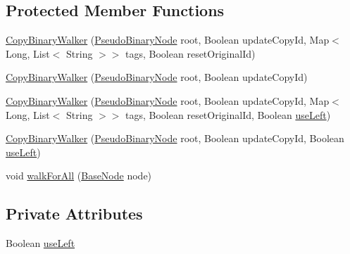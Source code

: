 \subsection*{Protected Member Functions}
\begin{DoxyCompactItemize}
\item 
\hyperlink{classit_1_1emarolab_1_1cagg_1_1core_1_1PseudoBinaryNode_1_1CopyBinaryWalker_a72a1ea8e24e0329cebfaa15f3ab577b2}{Copy\-Binary\-Walker} (\hyperlink{classit_1_1emarolab_1_1cagg_1_1core_1_1PseudoBinaryNode}{Pseudo\-Binary\-Node} root, Boolean update\-Copy\-Id, Map$<$ Long, List$<$ String $>$$>$ tags, Boolean reset\-Original\-Id)
\item 
\hyperlink{classit_1_1emarolab_1_1cagg_1_1core_1_1PseudoBinaryNode_1_1CopyBinaryWalker_a852a56b0a0f2d91c076d951e014b59b8}{Copy\-Binary\-Walker} (\hyperlink{classit_1_1emarolab_1_1cagg_1_1core_1_1PseudoBinaryNode}{Pseudo\-Binary\-Node} root, Boolean update\-Copy\-Id)
\item 
\hyperlink{classit_1_1emarolab_1_1cagg_1_1core_1_1PseudoBinaryNode_1_1CopyBinaryWalker_a817a936ca5015b543f218ca2652068a7}{Copy\-Binary\-Walker} (\hyperlink{classit_1_1emarolab_1_1cagg_1_1core_1_1PseudoBinaryNode}{Pseudo\-Binary\-Node} root, Boolean update\-Copy\-Id, Map$<$ Long, List$<$ String $>$$>$ tags, Boolean reset\-Original\-Id, Boolean \hyperlink{classit_1_1emarolab_1_1cagg_1_1core_1_1PseudoBinaryNode_1_1CopyBinaryWalker_a9d3d065b72a5c54d4cc8aaba58bb1115}{use\-Left})
\item 
\hyperlink{classit_1_1emarolab_1_1cagg_1_1core_1_1PseudoBinaryNode_1_1CopyBinaryWalker_abd581c43368c70c79904346058b14e71}{Copy\-Binary\-Walker} (\hyperlink{classit_1_1emarolab_1_1cagg_1_1core_1_1PseudoBinaryNode}{Pseudo\-Binary\-Node} root, Boolean update\-Copy\-Id, Boolean \hyperlink{classit_1_1emarolab_1_1cagg_1_1core_1_1PseudoBinaryNode_1_1CopyBinaryWalker_a9d3d065b72a5c54d4cc8aaba58bb1115}{use\-Left})
\item 
void \hyperlink{classit_1_1emarolab_1_1cagg_1_1core_1_1PseudoBinaryNode_1_1CopyBinaryWalker_adc5d14bb6a8735259554b475cd8d71ff}{walk\-For\-All} (\hyperlink{classit_1_1emarolab_1_1cagg_1_1core_1_1BaseNode}{Base\-Node} node)
\end{DoxyCompactItemize}
\subsection*{Private Attributes}
\begin{DoxyCompactItemize}
\item 
Boolean \hyperlink{classit_1_1emarolab_1_1cagg_1_1core_1_1PseudoBinaryNode_1_1CopyBinaryWalker_a9d3d065b72a5c54d4cc8aaba58bb1115}{use\-Left}
\end{DoxyCompactItemize}


